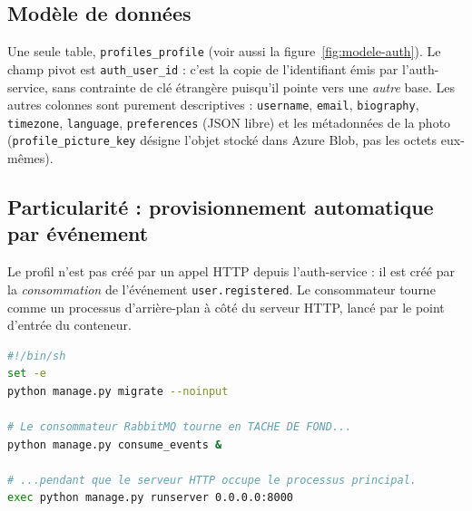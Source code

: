 \documentclass[11pt,a4paper,oneside]{report}
\newcommand{\code}[1]{\texttt{\small #1}}
\begin{document}
\subsection{Modèle de données}

Une seule table, \code{profiles\_profile} (voir aussi la
figure~\ref{fig:modele-auth}). Le champ pivot est \code{auth\_user\_id} : c'est
la copie de l'identifiant émis par l'auth-service, sans contrainte de clé
étrangère puisqu'il pointe vers une \emph{autre} base. Les autres colonnes sont
purement descriptives : \code{username}, \code{email}, \code{biography},
\code{timezone}, \code{language}, \code{preferences} (JSON libre) et les
métadonnées de la photo (\code{profile\_picture\_key} désigne l'objet stocké
dans Azure Blob, pas les octets eux-mêmes).

\subsection{Particularité : provisionnement automatique par événement}

Le profil n'est pas créé par un appel HTTP depuis l'auth-service : il est créé
par la \emph{consommation} de l'événement \code{user.registered}. Le
consommateur tourne comme un processus d'arrière-plan à côté du serveur HTTP,
lancé par le point d'entrée du conteneur.

\begin{lstlisting}[language=bash, caption={\code{entrypoint.sh} — le serveur HTTP et le consommateur d'événements dans le même conteneur}]
#!/bin/sh
set -e
python manage.py migrate --noinput

# Le consommateur RabbitMQ tourne en TACHE DE FOND...
python manage.py consume_events &

# ...pendant que le serveur HTTP occupe le processus principal.
exec python manage.py runserver 0.0.0.0:8000
\end{lstlisting}
\end{document}
